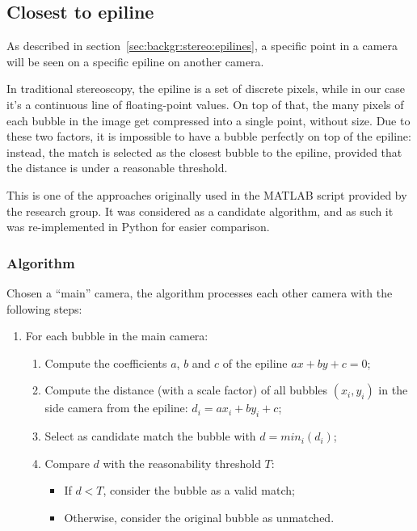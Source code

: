 \subsection{Closest to epiline}
\label{sec:match:epiline}

As described in section~\ref{sec:backgr:stereo:epilines}, a specific point in a camera will be seen on a specific epiline on another camera.

In traditional stereoscopy, the epiline is a set of discrete pixels, while in our case it's a continuous line of floating-point values.
On top of that, the many pixels of each bubble in the image get compressed into a single point, without size.
Due to these two factors, it is impossible to have a bubble perfectly on top of the epiline: instead, the match is selected as the closest bubble to the epiline, provided that the distance is under a reasonable threshold.

This is one of the approaches originally used in the MATLAB script provided by the research group.
It was considered as a candidate algorithm, and as such it was re-implemented in Python for easier comparison.

\subsubsection{Algorithm}

Chosen a ``main'' camera, the algorithm processes each other camera with the following steps:
\begin{enumerate}
	\itemsep 0em
	\item For each bubble in the main camera:
	      \begin{enumerate}
		      \item Compute the coefficients $a$, $b$ and $c$ of the epiline $ax+by+c{=}0$;
		      \item Compute the distance (with a scale factor) of all bubbles $(x_i, y_i)$ in the side camera from the epiline: $d_i = ax_i + by_i + c$;
		      \item Select as candidate match the bubble with $d=min_i(d_i)$;
		      \item Compare $d$ with the reasonability threshold $T$:
		            \begin{itemize}
			            \item If $d<T$, consider the bubble as a valid match;
			            \item Otherwise, consider the original bubble as unmatched.
		            \end{itemize}
	      \end{enumerate}
\end{enumerate}

